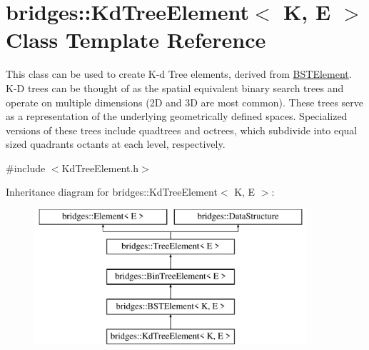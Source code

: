 \hypertarget{classbridges_1_1_kd_tree_element}{}\section{bridges\+::Kd\+Tree\+Element$<$ K, E $>$ Class Template Reference}
\label{classbridges_1_1_kd_tree_element}


This class can be used to create K-\/d Tree elements, derived from \mbox{\hyperlink{classbridges_1_1_b_s_t_element}{B\+S\+T\+Element}}. K-\/D trees can be thought of as the spatial equivalent binary search trees and operate on multiple dimensions (2D and 3D are most common). These trees serve as a representation of the underlying geometrically defined spaces. Specialized versions of these trees include quadtrees and octrees, which subdivide into equal sized quadrants octants at each level, respectively.  




{\ttfamily \#include $<$Kd\+Tree\+Element.\+h$>$}

Inheritance diagram for bridges\+::Kd\+Tree\+Element$<$ K, E $>$\+:\begin{figure}[H]
\begin{center}
\leavevmode
\includegraphics[height=5.000000cm]{classbridges_1_1_kd_tree_element}
\end{center}
\end{figure}
